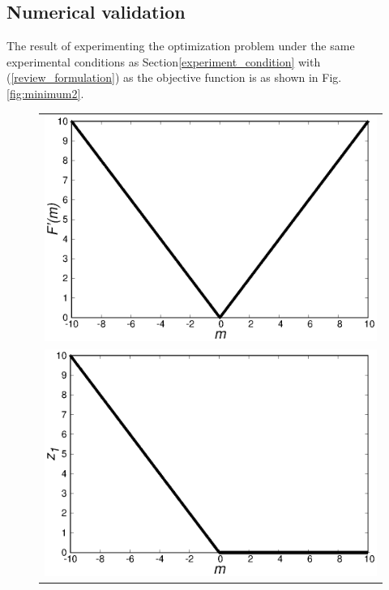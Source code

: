 \documentclass[fp,twocolumn]{jpsj3}
\begin{document}
\subsection{Numerical validation} %
The result of experimenting the optimization problem under the same experimental conditions as Section\ref{experiment_condition} with (\ref{review_formulation}) as the objective function is as shown in Fig.\ref{fig:minimum2}.
\begin{figure}[htbp]
  \begin{center}
    \begin{tabular}{c}
      \begin{minipage}{0.50\hsize}
        \centering
        \includegraphics[keepaspectratio,scale=0.33]{minimum_cost_non_t.eps}
      \end{minipage} \\
      \begin{minipage}{0.50\hsize}
        \centering
        \includegraphics[keepaspectratio,scale=0.33]{minimum_z1_non_t.eps}

\end{minipage}
\end{tabular}
\end{center}
\end{figure}
\end{document}
